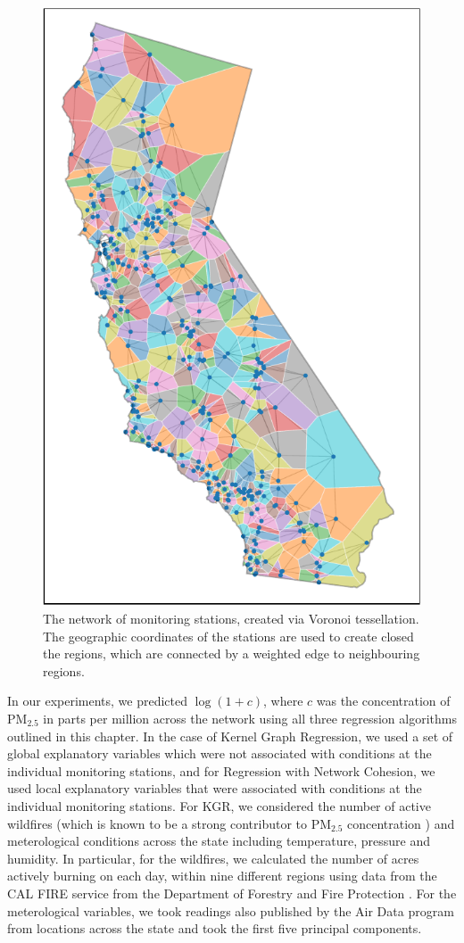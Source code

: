 \begin{figure}[ht]
    \centering
    \includegraphics[width=0.6\linewidth]{Figures/cali_plot2.pdf}
    \caption[The network of monitoring stations created via Voronoi tessellation]{The network of monitoring stations, created via Voronoi tessellation. The geographic coordinates of the stations are used to create closed the regions, which are connected by a weighted edge to neighbouring regions. }
    \label{fig:cali_voronoi}
\end{figure}

In our experiments, we predicted $\log(1+c)$, where $c$ was the concentration of PM$_{2.5}$ in parts per million across the network using all three regression algorithms outlined in this chapter. In the case of Kernel Graph Regression, we used a set of global explanatory variables which were not associated with conditions at the individual monitoring stations, and for Regression with Network Cohesion, we used local explanatory variables that were associated with conditions at the individual monitoring stations. For KGR, we considered the number of active wildfires (which is known to be a strong contributor to PM$_{2.5}$ concentration \citep{Jaffe2020}) and meterological conditions across the state including temperature, pressure and humidity. In particular, for the wildfires, we calculated the number of acres actively burning on each day, within nine different regions using data from the CAL FIRE service from the Department of Forestry and Fire Protection \citep{CALFIRE2023}. For the meterological variables, we took readings also published by the Air Data program from locations across the state and took the first five principal components. 

